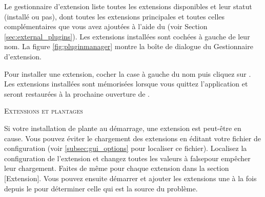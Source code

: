 Le gestionnaire d'extension liste toutes les extensions disponibles et leur statut (installé ou pas), dont toutes les extensions principales et toutes celles complémentaires que vous avez ajoutées à l'aide du  (voir Section \ref{sec:external_plugins}). Les extensions installées sont cochées à gauche de leur nom. La figure \ref{fig:pluginmanager} montre la boîte de dialogue du Gestionnaire d'extension.

Pour installer une extension, cocher la case à gauche du nom puis cliquez sur . Les extensions installées sont mémorisées lorsque vous quittez l'application et seront restaurées à la prochaine ouverture de \qg.

\begin{Tip}\caption{\textsc{Extensions et plantages}}
Si votre installation de \qg plante au démarrage, une extension est peut-être en cause. Vous pouvez éviter le chargement des extensions en éditant votre fichier de configuration (voir \ref{subsec:gui_options} pour localiser ce fichier). Localisez la configuration de l'extension et changez toutes les valeurs à \og false\fg pour empêcher leur chargement.  Faites de même pour chaque extension dans la section [Extension]. Vous pouvez ensuite démarrer \qg et ajouter les extensions une à la fois depuis le  pour déterminer celle qui est la source du problème.
\end{Tip}


